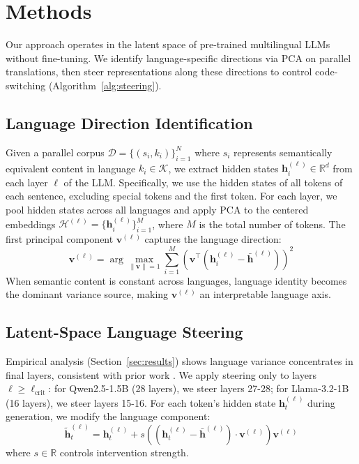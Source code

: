 \section{Methods}

Our approach operates in the latent space of pre-trained multilingual LLMs without fine-tuning.
We identify language-specific directions via PCA on parallel translations, then steer representations along these directions to control code-switching (Algorithm~\ref{alg:steering}).

\subsection{Language Direction Identification}

Given a parallel corpus $\mathcal{D} = \{(s_i, k_i)\}_{i=1}^N$ where $s_i$ represents semantically equivalent content in language $k_i \in \mathcal{K}$,
we extract hidden states $\mathbf{h}_i^{(\ell)} \in \mathbb{R}^d$ from each layer $\ell$ of the LLM.
Specifically, we use the hidden states of all tokens of each sentence, excluding special tokens and the first token.
For each layer, we pool hidden states across all languages and apply PCA to the centered embeddings $\mathcal{H}^{(\ell)} = \{\mathbf{h}_i^{(\ell)}\}_{i=1}^M$, where $M$ is the total number of tokens.
The first principal component $\mathbf{v}^{(\ell)}$ captures the language direction:
\begin{equation}
  \mathbf{v}^{(\ell)} = \arg\max_{\|\mathbf{v}\|=1} \sum_{i=1}^M \left(\mathbf{v}^\top (\mathbf{h}_i^{(\ell)} - \bar{\mathbf{h}}^{(\ell)})\right)^2
\end{equation}
When semantic content is constant across languages, language identity becomes the dominant variance source, making $\mathbf{v}^{(\ell)}$ an interpretable language axis.

\subsection{Latent-Space Language Steering}

Empirical analysis (Section~\ref{sec:results}) shows language variance concentrates in final layers, consistent with prior work \citep{tang-etal-2024-language, zhao2024largelanguagemodelshandle}.
We apply steering only to layers $\ell \geq \ell_{\text{crit}}$: for Qwen2.5-1.5B (28 layers), we steer layers 27-28; for Llama-3.2-1B (16 layers), we steer layers 15-16.
For each token's hidden state $\mathbf{h}_t^{(\ell)}$ during generation, we modify the language component:
\begin{equation}
  \tilde{\mathbf{h}}_t^{(\ell)} = \mathbf{h}_t^{(\ell)} + s \left((\mathbf{h}_t^{(\ell)} - \bar{\mathbf{h}}^{(\ell)}) \cdot \mathbf{v}^{(\ell)}\right) \mathbf{v}^{(\ell)}
\end{equation}
where $s \in \mathbb{R}$ controls intervention strength.

